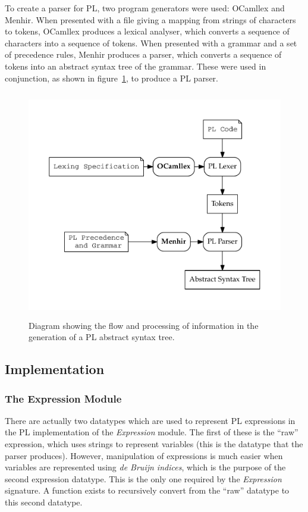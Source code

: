 \documentclass[12pt,a4paper,twoside,openright]{report}
\begin{document}
To create a parser for PL, two program generators were used:
OCamllex and Menhir. When presented with a
file giving a mapping from strings of characters to tokens,
OCamllex produces a lexical analyser, which converts a sequence
of characters into a sequence of tokens. When presented with a
grammar and a set of precedence rules, Menhir produces a parser,
which converts a sequence of tokens into an abstract syntax tree
of the grammar. These were used in conjunction, as shown in
figure~\ref{fig:parsing}, to produce a PL parser.

\begin{figure}
	\centering
	\includegraphics[height=10cm]{parsing}
	\caption{Diagram showing the flow and processing of
		information in the generation of a PL abstract
		syntax tree.}
	\label{fig:parsing}
\end{figure}

\subsection{Implementation}

\subsubsection{The Expression Module}
There are actually two datatypes which are used to
represent PL expressions in the
PL implementation of the \emph{Expression} module.
The first of these is the ``raw'' expression, which
uses strings to represent variables (this is the
datatype that the parser produces). However,
manipulation of expressions is much easier when
variables are represented using \emph{de Bruijn indices},
which is the purpose of the second expression datatype.
This is the only one required by the \emph{Expression}
signature. A function exists to recursively convert
from the ``raw'' datatype to this second datatype.
\end{document}

